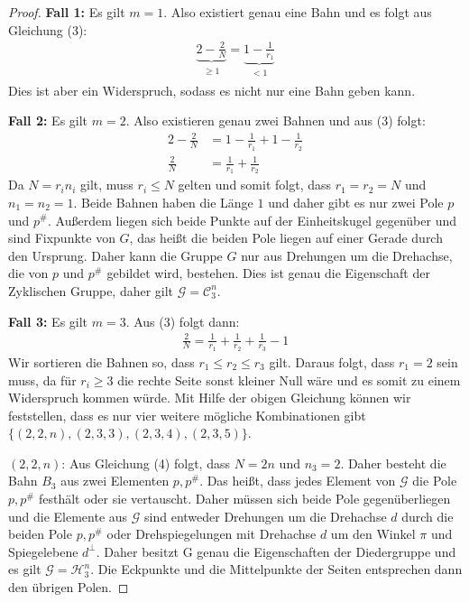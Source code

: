 \begin{proof}
	\textbf{Fall 1:} Es gilt $m=1$. Also existiert genau eine Bahn und es folgt aus Gleichung (3):
	\begin{align*}
	\underbrace{2-\frac{2}{N}}_{\substack{\geq 1}} = \underbrace{1-\frac{1}{r_1}}_{\substack{<1}}
	\end{align*}
	Dies ist aber ein Widerspruch, sodass es nicht nur eine Bahn geben kann.

	\textbf{Fall 2:} Es gilt $m=2$. Also existieren genau zwei Bahnen und aus (3) folgt:
	\begin{align*}
	2-\frac{2}{N} &= 1-\frac{1}{r_1} + 1-\frac{1}{r_2} \\
	\frac{2}{N} &= \frac{1}{r_1} + \frac{1}{r_2}
	\end{align*}
	Da $N=r_i n_i$ gilt, muss $r_i \leq N$ gelten und somit folgt, dass $r_1 = r_2 = N$ und $n_1 = n_2 = 1$. Beide Bahnen haben die Länge $1$ und daher gibt es nur zwei Pole $p$ und $p^{\#}$. Außerdem liegen sich beide Punkte auf der Einheitskugel gegenüber und sind Fixpunkte von $G$, das heißt die beiden Pole liegen auf einer Gerade durch den Ursprung. Daher kann die Gruppe $G$ nur aus Drehungen um die Drehachse, die von $p$ und $p^{\#}$ gebildet wird, bestehen. Dies ist genau die Eigenschaft der Zyklischen Gruppe, daher gilt $\mathcal{G}=\mathcal{C}_3^n$.

	\textbf{Fall 3:} Es gilt $m=3$. Aus (3) folgt dann:
	\begin{align}
	\frac{2}{N} = \frac{1}{r_1} + \frac{1}{r_2} + \frac{1}{r_3} - 1
	\end{align}
	Wir sortieren die Bahnen so, dass $r_1 \leq r_2 \leq r_3$ gilt. Daraus folgt, dass $r_1 = 2$ sein muss, da für $r_i \geq 3$ die rechte Seite sonst kleiner Null wäre und es somit zu einem Widerspruch kommen würde. Mit Hilfe der obigen Gleichung können wir feststellen, dass es nur vier weitere mögliche Kombinationen gibt $\{(2,2,n),(2,3,3),(2,3,4),(2,3,5)\}$.


	$(2,2,n)$: Aus Gleichung (4) folgt, dass $N = 2n$ und $n_3=2$. Daher besteht die Bahn $B_3$ aus zwei Elementen $p, p^{\#}$. Das heißt, dass jedes Element von $\mathcal{G}$ die Pole $p,p^{\#}$ festhält oder sie vertauscht. Daher müssen sich beide Pole gegenüberliegen und die Elemente aus $\mathcal{G}$ sind entweder Drehungen um die Drehachse $d$ durch die beiden Pole $p,p^{\#}$ oder Drehspiegelungen mit Drehachse $d$ um den Winkel $\pi$ und Spiegelebene $d^{\perp}$. Daher besitzt G genau die Eigenschaften der Diedergruppe und es gilt $\mathcal{G} = \mathcal{H}_3^n$. Die Eckpunkte und die Mittelpunkte der Seiten entsprechen dann den übrigen Polen.



\end{proof}
